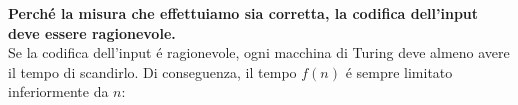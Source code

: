 \textbf{Perché la misura che effettuiamo sia corretta, la codifica dell'input deve essere ragionevole.} \\

Se la codifica dell'input é ragionevole, ogni macchina di Turing deve almeno avere il tempo di scandirlo. Di conseguenza, il tempo $f(n)$ é sempre limitato inferiormente da $n$: \\
